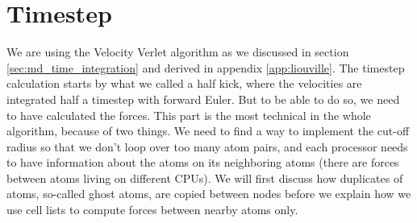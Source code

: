 \section{Timestep}
We are using the Velocity Verlet algorithm as we discussed in section \ref{sec:md_time_integration} and derived in appendix \ref{app:liouville}. The timestep calculation starts by what we called a half kick, where the velocities are integrated half a timestep with forward Euler. But to be able to do so, we need to have calculated the forces. This part is the most technical in the whole algorithm, because of two things. We need to find a way to implement the cut-off radius so that we don't loop over too many atom pairs, and each processor needs to have information about the atoms on its neighboring atoms (there are forces between atoms living on different CPUs). We will first discuss how duplicates of atoms, so-called ghost atoms, are copied between nodes before we explain how we use cell lists to compute forces between nearby atoms only. 
